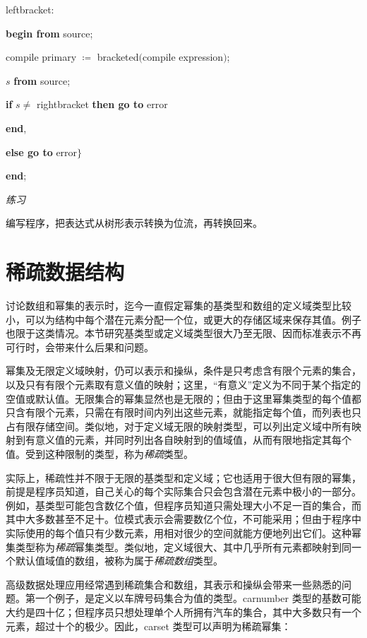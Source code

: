 \noindent
\quad \quad \quad leftbracket:

\noindent
\quad \quad \quad \textbf{begin from} source;

\noindent
\quad \quad \quad \quad compile primary $\coloneq$ bracketed$($compile expression$)$;

\noindent
\quad \quad \quad \quad $s$ \textbf{from} source;

\noindent
\quad \quad \quad \quad \textbf{if} $s \neq$ rightbracket \textbf{then go to} error

\noindent
\quad \quad \quad \textbf{end},

\noindent
\quad \quad \textbf{else go to} error$\}$

\noindent
\quad \textbf{end};

\noindent
\textit{练习}
\nopagebreak

\noindent
编写程序，把表达式从树形表示转换为位流，再转换回来。
\section[稀疏数据结构]{稀疏数据结构}
\label{sec:sparse-data-structures}

讨论数组和幂集的表示时，迄今一直假定幂集的基类型和数组的定义域类型比较小，可以为结构中每个潜在元素分配一个位，或更大的存储区域来保存其值。例子也限于这类情况。本节研究基类型或定义域类型很大乃至无限、因而标准表示不再可行时，会带来什么后果和问题。

幂集及无限定义域映射，仍可以表示和操纵，条件是只考虑含有限个元素的集合，以及只有有限个元素取有意义值的映射；这里，“有意义”定义为不同于某个指定的空值或默认值。无限集合的幂集显然也是无限的；但由于这里幂集类型的每个值都只含有限个元素，只需在有限时间内列出这些元素，就能指定每个值，而列表也只占有限存储空间。类似地，对于定义域无限的映射类型，可以列出定义域中所有映射到有意义值的元素，并同时列出各自映射到的值域值，从而有限地指定其每个值。受到这种限制的类型，称为\textit{稀疏}类型。

实际上，稀疏性并不限于无限的基类型和定义域；它也适用于很大但有限的幂集，前提是程序员知道，自己关心的每个实际集合只会包含潜在元素中极小的一部分。例如，基类型可能包含数亿个值，但程序员知道只需处理大小不足一百的集合，而其中大多数甚至不足十。位模式表示会需要数亿个位，不可能采用；但由于程序中实际使用的每个值只有少数元素，用相对很少的空间就能方便地列出它们。这种幂集类型称为\textit{稀疏}幂集类型。类似地，定义域很大、其中几乎所有元素都映射到同一个默认值域值的数组，被称为属于\textit{稀疏数组}类型。

高级数据处理应用经常遇到稀疏集合和数组，其表示和操纵会带来一些熟悉的问题。第一个例子，是定义以车牌号码集合为值的类型。carnumber 类型的基数可能大约是四十亿；但程序员只想处理单个人所拥有汽车的集合，其中大多数只有一个元素，超过十个的极少。因此，carset 类型可以声明为稀疏幂集：

